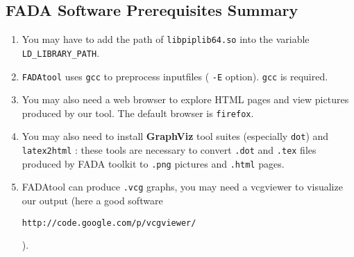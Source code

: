 \subsection{FADA Software Prerequisites Summary}
\label{fada_prerequis}
\begin{enumerate}
\item You may have to add the path of \verb|libpiplib64.so| into the variable \verb|LD_LIBRARY_PATH|.
 \item \verb|FADAtool| uses \verb|gcc| to preprocess inputfiles ( \verb|-E| option). \verb|gcc| is required.
 \item You may also need a web browser to explore HTML pages and view pictures produced by our tool. The default browser is \verb|firefox|.
 \item You may also need to install \textbf{GraphViz} tool suites (especially \verb|dot|) and \verb|latex2html| : these tools are necessary to convert \verb|.dot| and \verb|.tex| files produced by FADA toolkit to \verb|.png| pictures and \verb|.html| pages.
 \item FADAtool can produce \verb|.vcg| graphs, you may need a vcgviewer to visualize our output (here a good software \begin{small}\verb|http://code.google.com/p/vcgviewer/|                                                                                                                       \end{small}).
\end{enumerate}


% 
